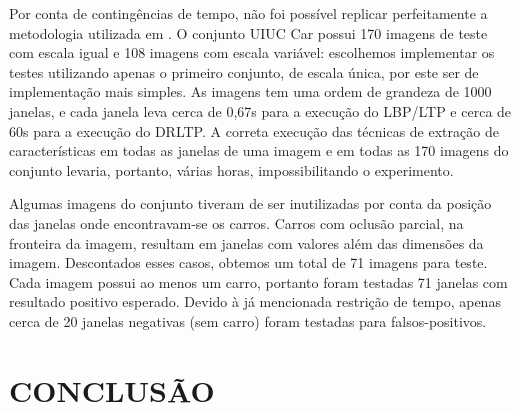 \documentclass[a4paper,twocolumn]{article}
\begin{document}
Por conta de contingências de tempo, não foi possível replicar perfeitamente a metodologia utilizada em \cite{satpathy}. O conjunto UIUC Car possui 170 imagens de teste com escala igual e 108 imagens com escala variável: escolhemos implementar os testes utilizando apenas o primeiro conjunto, de escala única, por este ser de implementação mais simples. As imagens tem uma ordem de grandeza de 1000 janelas, e cada janela leva cerca de 0,67s para a execução do LBP/LTP e cerca de 60s para a execução do DRLTP. A correta execução das técnicas de extração de características em todas as janelas de uma imagem e em todas as 170 imagens do conjunto levaria, portanto, várias horas, impossibilitando o experimento.

Algumas imagens do conjunto tiveram de ser inutilizadas por conta da posição das janelas onde encontravam-se os carros. Carros com oclusão parcial, na fronteira da imagem, resultam em janelas com valores além das dimensões da imagem. Descontados esses casos, obtemos um total de 71 imagens para teste. Cada imagem possui ao menos um carro, portanto foram testadas 71 janelas com resultado positivo esperado. Devido à já mencionada restrição de tempo, apenas cerca de 20 janelas negativas (sem carro) foram testadas para falsos-positivos.




\section{CONCLUSÃO}
\end{document}

